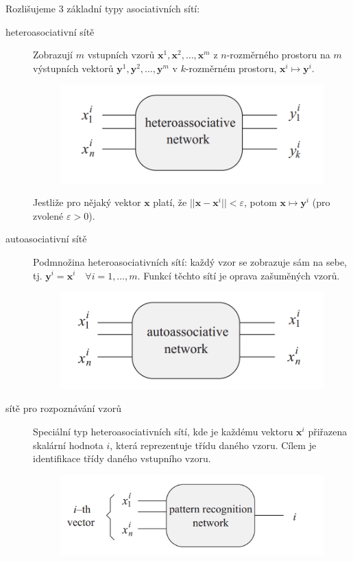 \documentclass[11pt]{report} %
\renewcommand{\vec}[1]{\mathbf{#1}}
\numberwithin{equation}{section}
\begin{document}
Rozlišujeme 3 základní typy asociativních sítí:

\begin{description}
	
	
	\item[heteroasociativní sítě] Zobrazují $m$ vstupních vzorů $\vec{x}^1, \vec{x}^2, \dots, \vec{x}^m$ z $n$-rozměrného prostoru na $m$ výstupních vektorů $\vec{y}^1, \vec{y}^2, \dots, \vec{y}^m$ v $k$-rozměrném prostoru, $\vec{x}^i \mapsto \vec{y}^i$. 
	\begin{figure}[H]
		\centering
		\includegraphics[scale=1]{img/nn_asoc_hetero}
	\end{figure}
	
	Jestliže pro nějaký vektor $\vec{x}$ platí, že $||\vec{x} - \vec{x}^i|| < \varepsilon$, potom $\vec{x} \mapsto \vec{y}^i$ (pro zvolené $\varepsilon > 0$).
	
	\item[autoasociativní sítě] Podmnožina heteroasociativních sítí: každý vzor se zobrazuje 
	sám na sebe, tj. $\vec{y}^i = \vec{x}^i \quad \forall i = 1, \dots, m$. Funkcí těchto sítí je oprava zašuměných vzorů.
	\begin{figure}[H]
		\centering
		\includegraphics[scale=1]{img/nn_asoc_auto}
	\end{figure}
	
	\item[sítě pro rozpoznávání vzorů] Speciální typ heteroasociativních sítí, kde je každému vektoru $\vec{x}^i$ přiřazena skalární hodnota $i$, která reprezentuje třídu daného vzoru. Cílem je identifikace třídy daného vstupního vzoru.
	\begin{figure}[H]
		\centering
		\includegraphics[scale=1]{img/nn_asoc_class}
	\end{figure}
	
\end{description}
\end{document}
